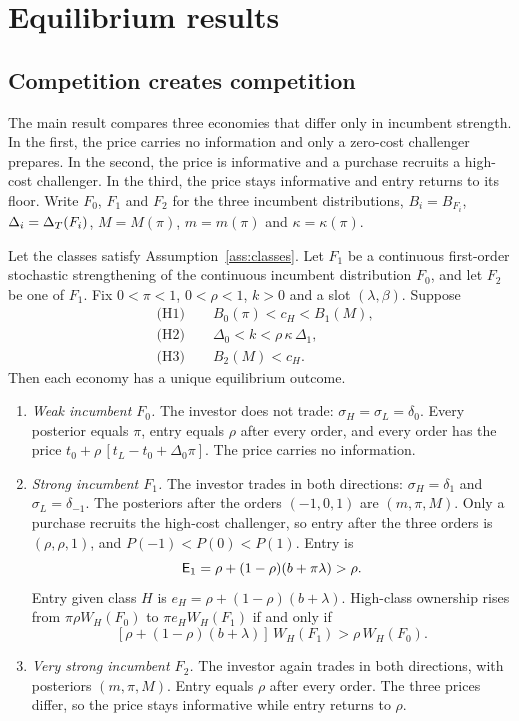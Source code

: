 \section{Equilibrium results}\label{sec:results}

\subsection{Competition creates competition}\label{sec:ccc}

The main result compares three economies that differ only in incumbent strength. In the first, the price carries
no information and only a zero-cost challenger prepares. In the second, the price is informative and a purchase
recruits a high-cost challenger. In the third, the price stays informative and entry returns to its floor. Write
\(F_0\), \(F_1\) and \(F_2\) for the three incumbent distributions, \(B_i=B_{F_i}\), \(\Delta_i=\Delta_T(F_i)\),
\(M=M(\pi)\), \(m=m(\pi)\) and \(\kappa=\kappa(\pi)\).

\begin{proposition}\label{prop:ccc}
Let the classes satisfy Assumption~\ref{ass:classes}. Let \(F_1\) be a continuous first-order stochastic
strengthening of the continuous incumbent distribution \(F_0\), and let \(F_2\) be one of \(F_1\). Fix
\(0<\pi<1\), \(0<\rho<1\), \(k>0\) and a slot \((\lambda,\beta)\). Suppose
\begin{align*}
&\text{(H1)}\qquad B_0(\pi)<c_H<B_1(M),\\
&\text{(H2)}\qquad \Delta_0<k<\rho\,\kappa\,\Delta_1,\\
&\text{(H3)}\qquad B_2(M)<c_H.
\end{align*}
Then each economy has a unique equilibrium outcome.
\begin{enumerate}[label=(\roman*),leftmargin=2em]
\item \emph{Weak incumbent \(F_0\).} The investor does not trade: \(\sigma_H=\sigma_L=\delta_0\). Every posterior
equals \(\pi\), entry equals \(\rho\) after every order, and every order has the price
\(t_0+\rho\,[t_L-t_0+\Delta_0\pi]\). The price carries no information.
\item \emph{Strong incumbent \(F_1\).} The investor trades in both directions: \(\sigma_H=\delta_1\) and
\(\sigma_L=\delta_{-1}\). The posteriors after the orders \((-1,0,1)\) are \((m,\pi,M)\). Only a purchase recruits
the high-cost challenger, so entry after the three orders is \((\rho,\rho,1)\), and \(P(-1)<P(0)<P(1)\). Entry is
\[
\mathsf{E}_1=\rho+(1-\rho)(b+\pi\lambda)>\rho.
\]
Entry given class \(H\) is \(e_H=\rho+(1-\rho)(b+\lambda)\). High-class ownership rises from \(\pi\rho W_H(F_0)\)
to \(\pi e_HW_H(F_1)\) if and only if
\[
[\rho+(1-\rho)(b+\lambda)]\,W_H(F_1)>\rho\,W_H(F_0).
\]
\item \emph{Very strong incumbent \(F_2\).} The investor again trades in both directions, with posteriors
\((m,\pi,M)\). Entry equals \(\rho\) after every order. The three prices differ, so the price stays informative
while entry returns to \(\rho\).
\end{enumerate}
\end{proposition}

